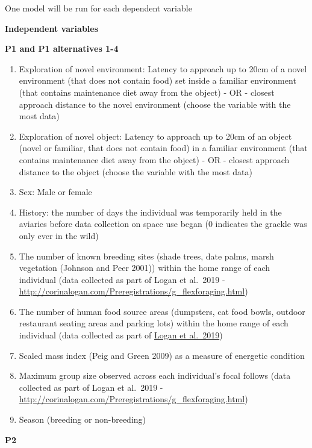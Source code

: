 \documentclass[
]{article}
\begin{document}
One model will be run for each dependent variable

\textbf{Independent variables}

\textbf{P1 and P1 alternatives 1-4}

\begin{enumerate}
\def\labelenumi{\arabic{enumi})}
\item
  Exploration of novel environment: Latency to approach up to 20cm of a
  novel environment (that does not contain food) set inside a familiar
  environment (that contains maintenance diet away from the object) - OR
  - closest approach distance to the novel environment (choose the
  variable with the most data)
\item
  Exploration of novel object: Latency to approach up to 20cm of an
  object (novel or familiar, that does not contain food) in a familiar
  environment (that contains maintenance diet away from the object) - OR
  - closest approach distance to the object (choose the variable with
  the most data)
\item
  Sex: Male or female
\item
  History: the number of days the individual was temporarily held in the
  aviaries before data collection on space use began (0 indicates the
  grackle was only ever in the wild)
\item
  The number of known breeding sites (shade trees, date palms, marsh
  vegetation (Johnson and Peer 2001)) within the home range of each
  individual (data collected as part of Logan et al.~2019 -
  \url{http://corinalogan.com/Preregistrations/g_flexforaging.html})
\item
  The number of human food source areas (dumpsters, cat food bowls,
  outdoor restaurant seating areas and parking lots) within the home
  range of each individual (data collected as part of
  \href{http://corinalogan.com/Preregistrations/g_flexforaging.html}{Logan
  et al.~2019})
\item
  Scaled mass index (Peig and Green 2009) as a measure of energetic
  condition
\item
  Maximum group size observed across each individual's focal follows
  (data collected as part of Logan et al.~2019 -
  \url{http://corinalogan.com/Preregistrations/g_flexforaging.html})
\item
  Season (breeding or non-breeding)
\end{enumerate}

\textbf{P2}
\end{document}
